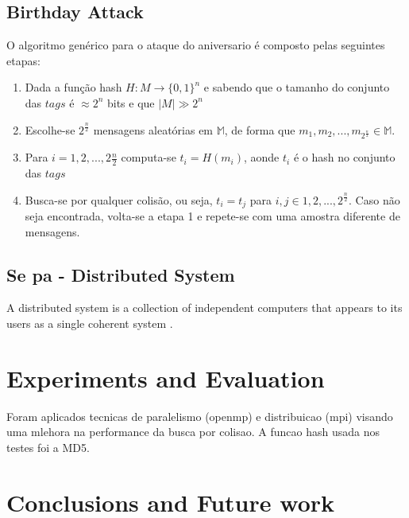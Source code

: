 \documentclass[12pt]{article}
\begin{document}
\subsection{Birthday Attack}

O algoritmo genérico para o ataque do aniversario é composto pelas seguintes etapas:
\begin{enumerate}
\item Dada a função hash \(H : M \to \{0,1\}^n\) e sabendo que o tamanho do conjunto das \(tags\) é \(\approx 2^n\) bits e que \(| M | \gg 2^n\)
\item Escolhe-se \(2^\frac{n}{2}\) mensagens aleatórias em \(\mathbb{M}\), de forma que \(m_1, m_2, ... , m_{2^\frac{n}{2}} \in \mathbb{M}\).
\item Para \(i = 1,2, ... , 2\frac{n}{2}\) computa-se \(t_i = H(m_i)\), aonde \(t_i\) é o hash no conjunto das \(tags\) %
\item Busca-se por qualquer colisão, ou seja, \(t_i = t_j\) para \(i, j \in {1, 2, ... , 2^\frac{n}{2}}\). Caso não seja encontrada, volta-se a etapa 1 e 
repete-se com uma amostra diferente de mensagens.
\end{enumerate}

\subsection{Se pa - Distributed System}
A distributed system is a collection of independent computers that appears to its users as a single 
coherent system \cite{tanenbaum2002distributed}.
 
\section{Experiments and Evaluation}

Foram aplicados tecnicas de paralelismo (openmp) e distribuicao (mpi) visando uma mlehora na performance
da busca por colisao. A funcao hash usada nos testes foi a MD5.

\section{Conclusions and Future work}



\end{document}
